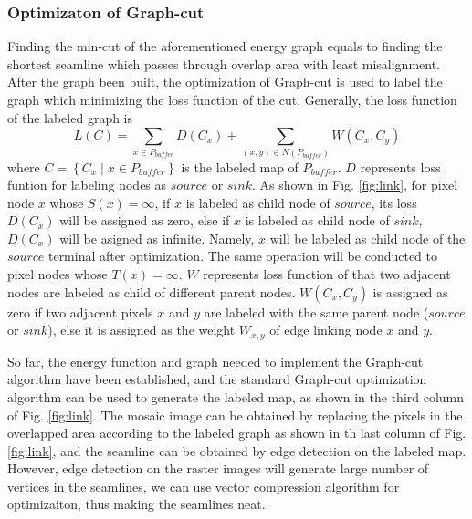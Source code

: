 \documentclass[journal]{IEEEtran}
\begin{document}
\subsubsection{Optimizaton of Graph-cut}
Finding the min-cut of the aforementioned energy graph equals to finding the shortest seamline which passes through overlap area with least misalignment. After the graph been built, the optimization of Graph-cut is used to label the graph which minimizing the loss function of the cut. Generally, the loss function of the labeled graph is
\begin{equation}\label{eq5}
L(C)=\sum_{x\in P_{buffer}} D(C_x)+\sum_{(x,y)\in N(P_{buffer})} W(C_x,C_y)
\end{equation}
where $C=\left \{ C_{x}\mid x\in P_{buffer} \right \}$ is the labeled map of $P_{buffer}$. $D$ represents loss funtion for labeling nodes as $source$ or $sink$. As shown in Fig. \ref{fig:link}, for pixel node $x$ whose $S(x)=\infty$, if $x$ is labeled as child node of $source$, its loss $D(C_x)$ will be assigned as zero, else if $x$ is labeled as child node of $sink$, $D(C_x)$ will be asigned as infinite. Namely, $x$ will be labeled as child node of the $source$ terminal after optimization. The same operation will be conducted to pixel nodes whose $T(x)=\infty$. $W$ represents loss function of that two adjacent nodes are labeled as child of different parent nodes. $W(C_x,C_y)$ is assigned as zero if two adjacent pixels $x$ and $y$ are labeled with the same parent node ($source$ or $sink$), else it is assigned as the weight $W_{x,y}$ of edge linking node $x$ and $y$.

So far, the energy function and graph needed to implement the Graph-cut algorithm have been established, and the standard Graph-cut optimization algorithm can be used to generate the labeled map, as shown in the third column of Fig. \ref{fig:link}. The mosaic image can be obtained by replacing the pixels in the overlapped area according to the labeled graph as shown in th last column of Fig. \ref{fig:link}, and the seamline can be obtained by edge detection on the labeled map. However, edge detection on the raster images will generate large number of vertices in the seamlines, we can use vector compression algorithm for optimizaiton, thus making the seamlines neat.
\end{document}
